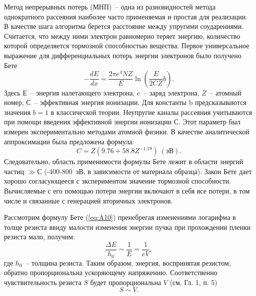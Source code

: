 Метод непрерывных потерь (МНП)~-- одна из разновидностей метода однократного рассеяния наиболее часто применяемая и простая для реализации. В качестве шага алгоритма берется расстояние между упругими соударениями. Считается, что между ними электрон равномерно теряет энергию, количество которой определяется тормозной способностью вещества.
Первое универсальное выражение для дифференциальных потерь энергии электронов было получено Бете
\begin{equation}
-\frac{dE}{dx}=\frac{2\pi e^4 NZ}{E} \ln \left(\frac{E}{2CZ}b\right).
\label{eq:A10}
\end{equation}
Здесь $Е$~-- энергия налетающего электрона, $e$~-- заряд электрона, $Z$~-- атомный номер, $С$~-- эффективная энергия ионизации. Для константы b предсказываются значения $b = 1$ в классической теории. Неупругие каналы рассеяния учитываются при помощи введения эффективной энергии ионизации С. Этот параметр был измерен экспериментально методами атомной физики. В качестве аналитической аппроксимации была предложена формула:
\begin{equation}
C=Z\left(9.76+58.8Z^{-1.19}\right)~(\text{эВ}).
\label{eq:A11}
\end{equation}
Следовательно, область применимости формулы Бете лежит в области энергий частиц $\gg С$  (-400-800~эВ, в зависимости от материала образца). Закон Бете дает хорошо согласующееся с экспериментом значение тормозной способности. Вычисляемые с его помощью потери энергии включают в себя все потери, в том числе и связанные с генерацией вторичных электронов.

Рассмотрим формулу Бете (\ref{eq:A10}) пренебрегая изменениями логарифма в толще резиста ввиду малости изменения энергии пучка при прохождении пленки резиста мало, получим:
\begin{equation}
    \frac{\Delta E}{h_0} \sim \frac{1}{E} = \frac{1}{eV},
\end{equation}
где $h_0$~-- толщина резиста. Таким образом, энергия, воспринятая резистом, обратно пропорциональна ускоряющему напряжению. Соответственно чувствительность резиста $S$ будет пропорциональна $V$ (см. Гл. 1, п. 5)
\begin{equation}
    S \sim V.
\end{equation}

